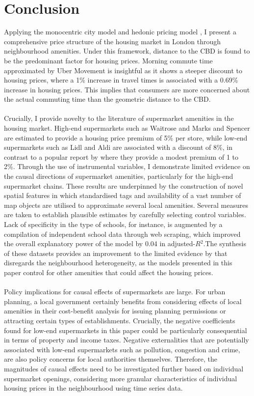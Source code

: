 \documentclass{article}
\begin{document}
\section{Conclusion} \label{section:conclusion}
Applying the monocentric city model \citep{AlonsoWilliam1964Lalu} and hedonic pricing model \citep{Rosen1984}, I present a comprehensive price structure of the housing market in London through neighbourhood amenities. Under this framework, distance to the CBD is found to be the predominant factor for housing prices. Morning commute time approximated by Uber Movement is insightful as it shows a steeper discount to housing prices, where a 1\% increase in travel times is associated with a 0.69\% increase in housing prices. This implies that consumers are more concerned about the actual commuting time than the geometric distance to the CBD.\\\\
Crucially, I provide novelty to the literature of supermarket amenities in the housing market. High-end supermarkets such as Waitrose and Marks and Spencer are estimated to provide a housing price premium of 5\% per store, while low-end supermarkets such as Lidl and Aldi are associated with a discount of 8\%, in contrast to a popular report by \citet{LloydsBank2016LivingHome} where they provide a modest premium of 1 to 2\%. Through the use of instrumental variables, I demonstrate limited evidence on the causal directions of supermarket amenities, particularly for the high-end supermarket chains. These results are underpinned by the construction of novel spatial features in which standardised tags and availability of a vast number of map objects are utilised to approximate several local amenities. Several measures are taken to establish plausible estimates by carefully selecting control variables. Lack of specificity in the type of schools, for instance, is augmented by a compilation of independent school data through web scraping, which improved the overall explanatory power of the model by 0.04 in adjusted-$R{^2}$.The synthesis of these datasets provides an improvement to the limited evidence by \citet{LloydsBank2016LivingHome} that disregards the neighbourhood heterogeneity, as the models presented in this paper control for other amenities that could affect the housing prices.\\\\
Policy implications for causal effects of supermarkets are large. For urban planning, a local government certainly benefits from considering effects of local amenities in their cost-benefit analysis for issuing planning permissions or attracting certain types of establishments. Crucially, the negative coefficients found for low-end supermarkets in this paper could be particularly consequential in terms of property and income taxes. Negative externalities that are potentially associated with low-end supermarkets such as pollution, congestion and crime, are also policy concerns for local authorities themselves. Therefore, the magnitudes of causal effects need to be investigated further based on individual supermarket openings, considering more granular characteristics of individual housing prices in the neighbourhood using time series data.
\end{document}
